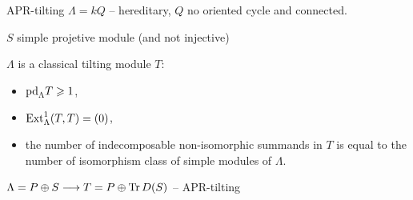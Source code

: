 \begin{frame}[fragile]{APR-tilting}
$\Lambda=kQ$ -- hereditary, $Q$ no oriented cycle and connected.\medskip 

$S$ simple projetive module (and not injective)

$\Lambda$ is a classical tilting module $T$: 
\begin{itemize}
\item ${\operatorname{pd}\nolimits}_\Lambda T \geqslant 1$, 
\item $\operatorname{Ext}\nolimits^1_\Lambda(T,T) = (0)$, 
\item the number of indecomposable non-isomorphic summands in $T$ is
  equal to the number of isomorphism class of simple modules of
  $\Lambda$. 
\end{itemize}

$\Lambda = P \oplus S \longrightarrow T = P\oplus \operatorname{Tr}\nolimits D(S)$ -- APR-tilting







\end{frame}

